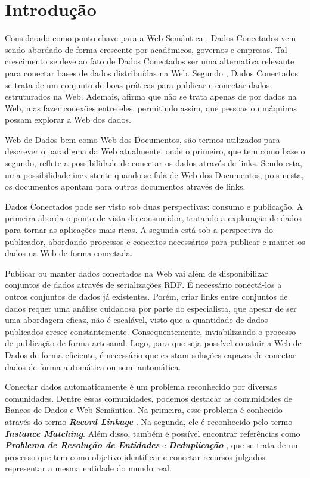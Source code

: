 \chapter{Introdução}
\label{cap:introducao}
Considerado como ponto chave para a Web Semântica \cite{berners2001semantic}, Dados Conectados vem sendo abordado de forma crescente por acadêmicos, governos e empresas. Tal crescimento se deve ao fato de Dados Conectados ser uma alternativa relevante para conectar bases de dados distribuídas na Web. Segundo , Dados Conectados se trata de um conjunto de boas práticas para publicar e conectar dados estruturados na Web. Ademais,  afirma que não se trata apenas de por dados na Web, mas fazer conexões entre eles, permitindo assim, que pessoas ou máquinas possam explorar a Web dos dados.

Web de Dados bem como Web dos Documentos, são termos utilizados para descrever o paradigma da Web atualmente, onde o primeiro, que tem como base o segundo, reflete a possibilidade de conectar os dados através de links. Sendo esta, uma possibilidade inexistente quando se fala de Web dos Documentos, pois nesta, os documentos apontam para outros documentos através de links.

Dados Conectados pode ser visto sob duas perspectivas: consumo e publicação. A primeira aborda o ponto de vista do consumidor, tratando a exploração de dados para tornar as aplicações mais ricas. A segunda está sob a perspectiva do publicador, abordando processos \cite{bizer2007publish, hyland2011joy, villazon2011methodological, Avila2015} e conceitos \cite{berners2006linked, wood2014linked} necessários para publicar e manter os dados na Web de forma conectada. 

Publicar ou manter dados conectados na Web vai além de disponibilizar conjuntos de dados através de serializações RDF. É necessário conectá-los a outros conjuntos de dados já existentes. Porém, criar links entre conjuntos de dados requer uma análise cuidadosa por parte do especialista, que apesar de ser uma abordagem eficaz, não é escalável, visto que a quantidade de dados publicados cresce constantemente. Consequentemente, inviabilizando o processo de publicação de forma artesanal. Logo, para que seja possível constuir a Web de Dados de forma eficiente, é necessário que existam soluções capazes de conectar dados de forma automática ou semi-automática.

Conectar dados automaticamente é um problema reconhecido por diversas comunidades. Dentre essas comunidades, podemos destacar as comunidades de Bancos de Dados e Web Semântica. Na primeira, esse problema é conhecido através do termo \textbf{\textit{Record Linkage}} \cite{gu2003record}. Na segunda, ele é reconhecido pelo termo \textbf{\textit{Instance Matching}}. Além disso, também é possível encontrar referências como \textbf{\textit{Problema de Resolução de Entidades}} \cite{menestrina2005generic} e \textbf{\textit{Deduplicação}} \cite{sarawagi2002interactive}, que se trata de um processo que tem como objetivo identificar e conectar recursos julgados representar a mesma entidade do mundo real.

